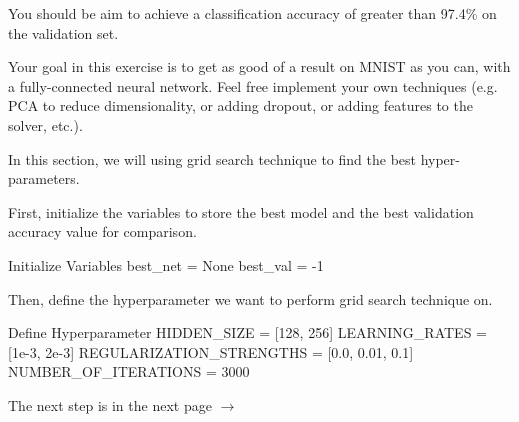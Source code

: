 \documentclass[12pt, a4paper]{article}
\begin{document}
                You should be aim to achieve a classification accuracy of greater than 97.4\% on the validation set.

                Your goal in this exercise is to get as good of a result on MNIST as you can, with a fully-connected neural network.
                Feel free implement your own techniques (e.g. PCA to reduce dimensionality, or adding dropout, or adding features to the solver, etc.).

                \vspace{1em}

                In this section, we will using grid search technique to find the best hyper-parameters.

                \vspace{1em}

                First, initialize the variables to store the best model and the best validation accuracy value for comparison.
                \begin{codeblock}{Initialize Variables}
                    best_net = None
                    best_val = -1
                \end{codeblock}

                Then, define the hyperparameter we want to perform grid search technique on.
                \begin{codeblock}{Define Hyperparameter}
                    HIDDEN_SIZE = [128, 256]
                    LEARNING_RATES = [1e-3, 2e-3]
                    REGULARIZATION_STRENGTHS = [0.0, 0.01, 0.1]
                    NUMBER_OF_ITERATIONS = 3000
                \end{codeblock}

                The next step is in the next page $\rightarrow$

        \pagebreak
\end{document}

